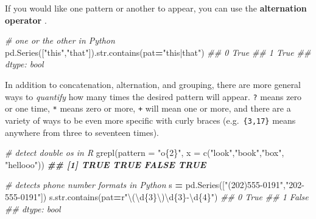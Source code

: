 \documentclass[
  12pt,
  krantz2]{krantz}
\makeatletter
\newenvironment{Shaded}{\begin{snugshade}}{\end{snugshade}}
\newcommand{\AttributeTok}[1]{\textcolor[rgb]{0.61,0.61,0.61}{#1}}
\newcommand{\BuiltInTok}[1]{#1}
\newcommand{\CommentTok}[1]{\textcolor[rgb]{0.37,0.37,0.37}{\textit{#1}}}
\newcommand{\DocumentationTok}[1]{\textcolor[rgb]{0.37,0.37,0.37}{\textbf{\textit{#1}}}}
\newcommand{\FunctionTok}[1]{\textcolor[rgb]{0,0,0}{#1}}
\newcommand{\NormalTok}[1]{#1}
\newcommand{\OperatorTok}[1]{\textcolor[rgb]{0.43,0.43,0.43}{\textbf{#1}}}
\newcommand{\SpecialCharTok}[1]{\textcolor[rgb]{0,0,0}{#1}}
\newcommand{\StringTok}[1]{\textcolor[rgb]{0.5,0.5,0.5}{#1}}
\newcommand{\VerbatimStringTok}[1]{\textcolor[rgb]{0.5,0.5,0.5}{#1}}
\newenvironment{kframe}{%
\medskip{}
\setlength{\fboxsep}{.8em}
 \def\at@end@of@kframe{}%
 \ifinner\ifhmode%
  \def\at@end@of@kframe{\end{minipage}}%
  \begin{minipage}{\columnwidth}%
 \fi\fi%
 \def\FrameCommand##1{\hskip\@totalleftmargin \hskip-\fboxsep
 \colorbox{shadecolor}{##1}\hskip-\fboxsep
     \hskip-\linewidth \hskip-\@totalleftmargin \hskip\columnwidth}%
 \MakeFramed {\advance\hsize-\width
   \@totalleftmargin\z@ \linewidth\hsize
   \@setminipage}}%
 {\par\unskip\endMakeFramed%
 \at@end@of@kframe}
\renewenvironment{Shaded}{\begin{kframe}}{\end{kframe}}
\makeatother
\begin{document}
If you would like one pattern or another to appear, you can use the \textbf{alternation operator} \texttt{\textbar{}}.

\begin{Shaded}
\begin{Highlighting}[]
\CommentTok{\# one or the other in Python}
\NormalTok{pd.Series([}\StringTok{"this"}\NormalTok{,}\StringTok{"that"}\NormalTok{]).}\BuiltInTok{str}\NormalTok{.contains(pat}\OperatorTok{=}\StringTok{"this|that"}\NormalTok{)}
\CommentTok{\#\# 0    True}
\CommentTok{\#\# 1    True}
\CommentTok{\#\# dtype: bool}
\end{Highlighting}
\end{Shaded}

In addition to concatenation, alternation, and grouping, there are more general ways to \emph{quantify} how many times the desired pattern will appear. \texttt{?} means zero or one time, \texttt{*} means zero or more, \texttt{+} will mean one or more, and there are a variety of ways to be even more specific with curly braces (e.g.~\texttt{\{3,17\}} means anywhere from three to seventeen times).

\begin{Shaded}
\begin{Highlighting}[]
\CommentTok{\# detect double o\textquotesingle{}s in R}
\FunctionTok{grepl}\NormalTok{(}\AttributeTok{pattern =} \StringTok{"o\{2\}"}\NormalTok{, }\AttributeTok{x =} \FunctionTok{c}\NormalTok{(}\StringTok{"look"}\NormalTok{,}\StringTok{"book"}\NormalTok{,}\StringTok{"box"}\NormalTok{, }\StringTok{"hellooo"}\NormalTok{))}
\DocumentationTok{\#\# [1]  TRUE  TRUE FALSE  TRUE}
\end{Highlighting}
\end{Shaded}

\begin{Shaded}
\begin{Highlighting}[]
\CommentTok{\# detects phone number formats in Python}
\NormalTok{s }\OperatorTok{=}\NormalTok{ pd.Series([}\StringTok{"(202)555{-}0191"}\NormalTok{,}\StringTok{"202{-}555{-}0191"}\NormalTok{])}
\NormalTok{s.}\BuiltInTok{str}\NormalTok{.contains(pat}\OperatorTok{=}\VerbatimStringTok{r"\textbackslash{}(\textbackslash{}d}\SpecialCharTok{\{3\}}\VerbatimStringTok{\textbackslash{})\textbackslash{}d}\SpecialCharTok{\{3\}}\VerbatimStringTok{{-}\textbackslash{}d}\SpecialCharTok{\{4\}}\VerbatimStringTok{"}\NormalTok{)}
\CommentTok{\#\# 0     True}
\CommentTok{\#\# 1    False}
\CommentTok{\#\# dtype: bool}
\end{Highlighting}
\end{Shaded}
\end{document}
